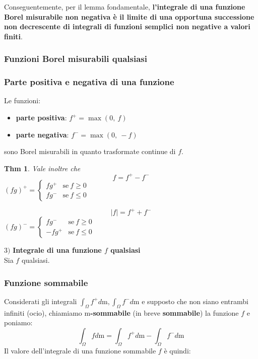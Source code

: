 \documentclass[a4paper,11pt]{article}
\theoremstyle{plain}
\newtheorem{thm}{Thm}[section]
\theoremstyle{definition}
\theoremstyle{remark}
\begin{document}
\noindent
Conseguentemente, per il lemma fondamentale, \textbf{l'integrale di una funzione Borel misurabile non negativa è il limite di una opportuna successione non decrescente di integrali di funzioni semplici non negative a valori finiti}.\\

\subsubsection{Funzioni Borel misurabili qualsiasi}
\subsubsection{Parte positiva e negativa di una funzione}
Le funzioni:
\begin{itemize}
    \item [] \textbf{parte positiva}: $f^{+}=\displaystyle \max(0,\ f)$ 
    \item [] \textbf{parte negativa}: $f^{-}=\displaystyle \max(0,\ -f)$
\end{itemize}

\noindent
sono Borel misurabili in quanto trasformate continue di $f$.

\begin{thm} Vale inoltre che 
$$
f=f^{+}-f^{-}
$$
$(fg)^{+}=\left\{\begin{array}{ll}
fg^{+} & \mathrm{s}\mathrm{e}\ f\geq 0\\
fg^{-} & \mathrm{s}\mathrm{e}\ f\leq 0
\end{array}\right.$

$$
|f|=f^{+}+f^{-}
$$
$(fg)^{-}=\left\{\begin{array}{ll}
fg^{-} & \mathrm{s}\mathrm{e}\ f\geq 0\\
-fg^{+} & \mathrm{s}\mathrm{e}\ f\leq 0
\end{array}\right.$
\end{thm}

\noindent
$3)$ \textbf{Integrale di una funzione $f$  qualsiasi} \\
\noindent
Sia $f$ qualsiasi. 

\subsubsection{Funzione sommabile}
Considerati gli integrali $\displaystyle \int_{\Omega}f^{+}d\mathrm{m}, \displaystyle \int_{\Omega}f^{-}d\mathrm{m}$ e  supposto che {non siano entrambi infiniti} (ocio), chiamiamo \textbf{$\mathrm{m}$-sommabile} (in breve \textbf{sommabile}) la funzione $f$ e poniamo:
$$
\int_{\Omega}fd\mathrm{m}=\int_{\Omega}f^{+}d\mathrm{m}-\int_{\Omega}f^{-}d\mathrm{m}
$$
Il valore dell'integrale di una funzione sommabile $f$ è quindi:
\end{document}
